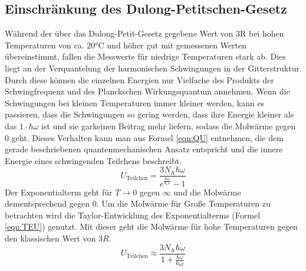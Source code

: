 \documentclass[titlepage = firstcover]{scrartcl}
\begin{document}
        \subsection{Einschränkung des Dulong-Petitschen-Gesetz}
            Während der über das Dulong-Petit-Gesetz gegebene Wert von 3R bei hohen Temperaturen von ca. 20°C und höher gut mit gemessenen Werten übereinstimmt,
            fallen die Messwerte für niedrige Temperaturen stark ab. Dies liegt an der Verquantelung der harmonischen Schwingungen in der Gitterstruktur. 
            Durch diese können die einzelnen Energien nur Vielfache des Produkts der Schwingfrequenz und des Planckschen Wirkungsquantum annehmen. Wenn 
            die Schwingungen bei kleinen Temperaturen immer kleiner werden, kann es passieren, dass die Schwingungen so gering werden, dass ihre Energie
            kleiner als das $1 \cdot \hbar \omega$ ist und sie garkeinen Beitrag mehr liefern, sodass die Molwärme gegen 0 geht. Dieses Verhalten kann man aus Formel
            \eqref{eqn:QU} entnehmen, die dem gerade beschriebenen quantenmechanischen Ansatz entspricht und die innere Energie eines schwingenden Teilchens beschreibt.
            \begin{equation}
              U_{\text{Teilchen}} = \frac{3 N_{\text{A}} \hbar \omega}{e^{\frac{\hbar \omega}{k_bT}}-1}
              \label{eqn:QU}
            \end{equation} 
            Der Exponentialterm geht für $T \rightarrow 0$ gegen $\infty$ und die Molwärme dementsprechend gegen 0. Um die Molwärme für Große Temperaturen
            zu betrachten wird die Taylor-Entwicklung des Exponentialterms (Formel \eqref{eqn:TEU}) genutzt. Mit dieser geht die Molwärme für hohe Temperaturen gegen 
            den klassischen Wert von $3R$.
            \begin{equation}
              U_{\text{Teilchen}} \approx \frac{3 N_{\text{A}} \hbar \omega}{1 + \frac{\hbar \omega}{k_{\text{b}T}}}
              \label{eqn:TEU}
            \end{equation} 

    \newpage
\end{document}
